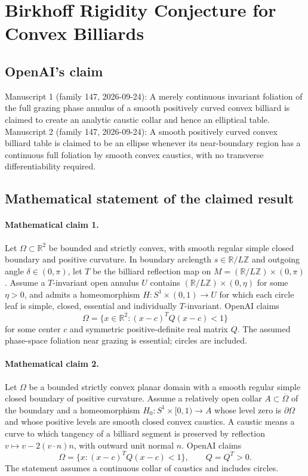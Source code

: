 \documentclass[11pt]{article}
\begin{document}
\section*{Birkhoff Rigidity Conjecture for Convex Billiards}

\subsection{OpenAI's claim}
Manuscript 1 (family 147, 2026-09-24): A merely continuous invariant foliation of the full grazing phase annulus of a smooth positively curved convex billiard is claimed to create an analytic caustic collar and hence an elliptical table. Manuscript 2 (family 147, 2026-09-24): A smooth positively curved convex billiard table is claimed to be an ellipse whenever its near-boundary region has a continuous full foliation by smooth convex caustics, with no transverse differentiability required.

\subsection{Mathematical statement of the claimed result}
\paragraph{Mathematical claim 1.} Let $\Omega\subset\mathbb R^2$ be bounded and strictly convex, with smooth regular simple closed boundary and positive curvature. In boundary arclength $s\in\mathbb R/L\mathbb Z$ and outgoing angle $\delta\in(0,\pi)$, let $T$ be the billiard reflection map on $M=(\mathbb R/L\mathbb Z)\times(0,\pi)$. Assume a $T$-invariant open annulus $U$ contains $(\mathbb R/L\mathbb Z)\times(0,\eta)$ for some $\eta>0$, and admits a homeomorphism $H:S^1\times(0,1)\to U$ for which each circle leaf is simple, closed, essential and individually $T$-invariant. OpenAI claims
\[
\Omega=\{x\in\mathbb R^2:(x-c)^TQ(x-c)<1\}
\]
for some center $c$ and symmetric positive-definite real matrix $Q$. The assumed phase-space foliation near grazing is essential; circles are included.

\paragraph{Mathematical claim 2.} Let $\Omega$ be a bounded strictly convex planar domain with a smooth regular simple closed boundary of positive curvature. Assume a relatively open collar $A\subset\overline\Omega$ of the boundary and a homeomorphism $H_0:S^1\times[0,1)\to A$ whose level zero is $\partial\Omega$ and whose positive levels are smooth closed convex caustics. A caustic means a curve to which tangency of a billiard segment is preserved by reflection $v\mapsto v-2(v\cdot n)n$, with outward unit normal $n$. OpenAI claims
\[
\Omega=\{x:(x-c)^TQ(x-c)<1\},\qquad Q=Q^T>0.
\]
The statement assumes a continuous collar of caustics and includes circles.
\end{document}
